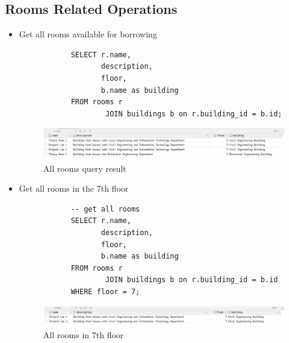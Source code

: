 \documentclass[12pt,titlepage]{article}
\begin{document}
\subsection{Rooms Related Operations}
\begin{itemize}
    \item {
        Get all rooms available for borrowing

        \begin{verbatim}
            SELECT r.name,
                   description,
                   floor,
                   b.name as building
            FROM rooms r
                    JOIN buildings b on r.building_id = b.id;
        \end{verbatim}

        \begin{figure}[h]
            \centering
            \includegraphics[width=\textwidth]{images/all-rooms-query.png}
            \caption{All rooms query result}
        \end{figure}
    }
    \item {
        Get all rooms in the 7th floor

        \begin{verbatim}
            -- get all rooms
            SELECT r.name,
                   description,
                   floor,
                   b.name as building
            FROM rooms r
                    JOIN buildings b on r.building_id = b.id
            WHERE floor = 7;
        \end{verbatim}

        \begin{figure}[h]
            \centering
            \includegraphics[width=\textwidth]{images/7th-floor-query.png}
            \caption{All rooms in 7th floor}
        \end{figure}
    }
\end{itemize}
\end{document}
